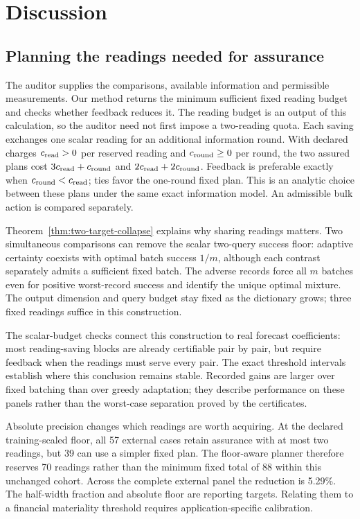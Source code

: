 \section{Discussion}
\subsection{Planning the readings needed for assurance}
The auditor supplies the comparisons, available information and permissible
measurements. Our method returns the minimum sufficient fixed reading budget
and checks whether feedback reduces it. The reading budget is an output of this calculation, so the auditor need
not first impose a two-reading quota. Each saving exchanges one scalar
reading for an additional information round. With declared charges
$c_{\rm read}>0$ per reserved reading and $c_{\rm round}\geq0$ per
round, the two assured plans cost $3c_{\rm read}+c_{\rm round}$ and
$2c_{\rm read}+2c_{\rm round}$. Feedback is preferable exactly when
$c_{\rm round}<c_{\rm read}$; ties favor the one-round fixed plan.
This is an analytic choice between these plans under the same exact
information model. An admissible bulk action is compared separately.

Theorem~\ref{thm:two-target-collapse} explains why sharing readings matters.
Two simultaneous comparisons can remove the scalar two-query success floor:
adaptive certainty coexists with optimal batch success $1/m$, although each
contrast separately admits a sufficient fixed batch. The adverse records
force all $m$ batches even for positive worst-record success and identify the
unique optimal mixture. The output dimension and query budget stay fixed as
the dictionary grows; three fixed readings suffice in this construction.

The scalar-budget checks connect this construction to real forecast
coefficients: most reading-saving blocks are already certifiable pair by
pair, but require feedback when the readings must serve every pair.
The exact threshold intervals establish where this conclusion remains
stable. Recorded gains are larger over fixed batching than over greedy
adaptation; they describe performance on these panels rather than the
worst-case separation proved by the certificates.

Absolute precision changes which readings are worth acquiring. At the
declared training-scaled floor, all 57 external cases retain assurance with
at most two readings, but 39 can use a simpler fixed plan. The floor-aware
planner therefore reserves 70 readings rather than the minimum fixed total
of 88 within this unchanged cohort. Across the complete external panel the
reduction is 5.29\%. The half-width fraction and absolute floor are
reporting targets. Relating them to a financial materiality threshold
requires application-specific calibration.

